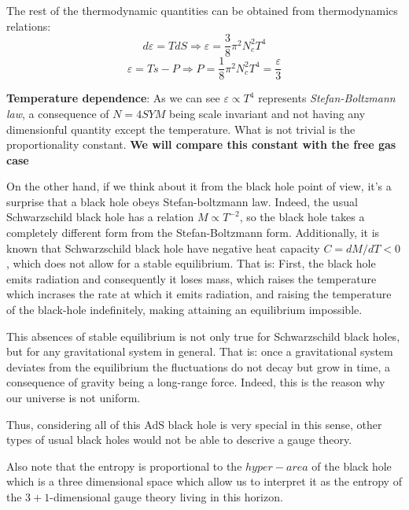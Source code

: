 \documentclass[12pt]{article}
\begin{document}
The rest of the thermodynamic quantities can be obtained from thermodynamics relations:
\[
    d\varepsilon = TdS \Rightarrow \varepsilon = \frac{3}{8} \pi^2 N_c^2T^4
\]
\[
    \varepsilon = Ts - P \Rightarrow P = \frac{1}{8} \pi^2 N_c^2T^4 = \frac{\varepsilon}{3}
\]

\textbf{Temperature dependence}: As we can see $\varepsilon\propto T^4$ represents \textit{Stefan-Boltzmann law}, a consequence of $N=4 SYM$ being scale invariant and not having any dimensionful quantity except the temperature. What is not trivial is the proportionality constant. \textbf{We will compare this constant with the free gas case}

\vspace{.25cm}

On the other hand, if we think about it from the black hole point of view, it's a surprise that a black hole obeys Stefan-boltzmann law. Indeed, the usual Schwarzschild black hole has a relation $M\propto T^{-2}$, so the black hole takes a completely different form from the Stefan-Boltzmann form. Additionally, it is known that Schwarzschild black hole have negative heat capacity $C=dM/dT<0$, which does not allow for a stable equilibrium. That is: First, the black hole emits radiation and consequently it loses mass, which raises the temperature which incrases the rate at which it emits radiation, and raising the temperature of the black-hole indefinitely, making attaining an equilibrium impossible.

\vspace{.25cm}

This absences of stable equilibrium is not only true for Schwarzschild black holes, but for any gravitational system in general. That is: once a gravitational system deviates from the equilibrium the fluctuations do not decay but grow in time, a consequence of gravity being a long-range force. Indeed, this is the reason why our universe is not uniform.

\vspace{.25cm}

Thus, considering all of this AdS black hole is very special in this sense, other types of usual black holes would not be able to descrive a gauge theory.

Also note that the entropy is proportional to the $hyper-area$ of the black hole which is a three dimensional space which allow us to interpret it as the entropy of the $3+1$-dimensional gauge theory living in this horizon.

\vspace{.25cm}
\end{document}
